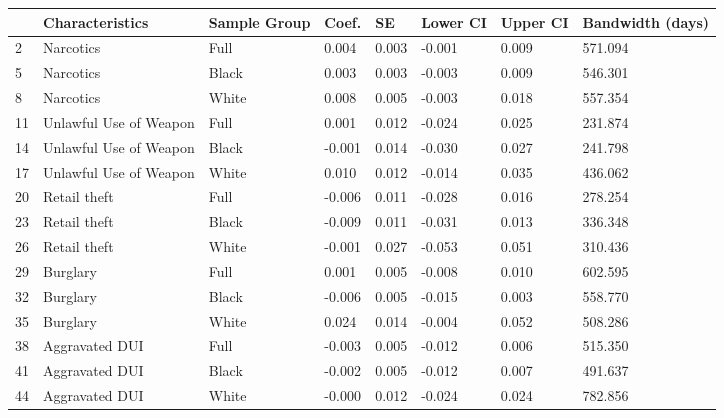 \begin{tabular}{llllllll}
\toprule
{} &         Characteristics & Sample Group &   Coef. &     SE & Lower CI & Upper CI & Bandwidth (days) \\
\midrule
2  &               Narcotics &         Full &   0.004 &  0.003 &   -0.001 &    0.009 &          571.094 \\
5  &               Narcotics &        Black &   0.003 &  0.003 &   -0.003 &    0.009 &          546.301 \\
8  &               Narcotics &        White &   0.008 &  0.005 &   -0.003 &    0.018 &          557.354 \\
11 &  Unlawful Use of Weapon &         Full &   0.001 &  0.012 &   -0.024 &    0.025 &          231.874 \\
14 &  Unlawful Use of Weapon &        Black &  -0.001 &  0.014 &   -0.030 &    0.027 &          241.798 \\
17 &  Unlawful Use of Weapon &        White &   0.010 &  0.012 &   -0.014 &    0.035 &          436.062 \\
20 &            Retail theft &         Full &  -0.006 &  0.011 &   -0.028 &    0.016 &          278.254 \\
23 &            Retail theft &        Black &  -0.009 &  0.011 &   -0.031 &    0.013 &          336.348 \\
26 &            Retail theft &        White &  -0.001 &  0.027 &   -0.053 &    0.051 &          310.436 \\
29 &                Burglary &         Full &   0.001 &  0.005 &   -0.008 &    0.010 &          602.595 \\
32 &                Burglary &        Black &  -0.006 &  0.005 &   -0.015 &    0.003 &          558.770 \\
35 &                Burglary &        White &   0.024 &  0.014 &   -0.004 &    0.052 &          508.286 \\
38 &          Aggravated DUI &         Full &  -0.003 &  0.005 &   -0.012 &    0.006 &          515.350 \\
41 &          Aggravated DUI &        Black &  -0.002 &  0.005 &   -0.012 &    0.007 &          491.637 \\
44 &          Aggravated DUI &        White &  -0.000 &  0.012 &   -0.024 &    0.024 &          782.856 \\
\bottomrule
\end{tabular}
